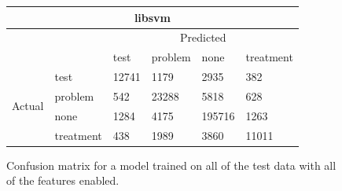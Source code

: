 \documentclass[preprint]{style}
\begin{document}
\begin{figure}[t]
\begin{center}
\begin{tabular}{|l|l|l|l|l|l|}
	\end{tabular}
\end{center}
		
\begin{center}
	\begin{tabular}{|l|l|l|l|l|l|}
	\hline
	\multicolumn{6}{|c|}{\bf libsvm} \\ \hline
	& & \multicolumn{4}{|c|}{Predicted} \\ \hline
	& & test & problem & none & treatment \\ \hline
	\multirow{4}{*}{\begin{sideways}Actual\end{sideways}}
		& test & 12741 & 1179 & 2935 & 382	\\ \hline
		& problem & 542 & 23288 & 5818 & 628	\\ \hline
		& none & 1284 & 4175 & 195716 & 1263	\\ \hline
		& treatment & 438 & 1989 & 3860 & 11011	\\ \hline

	\end{tabular}
\end{center}

\caption{Confusion matrix for a model trained on all of the test data with all of the features enabled.}
\label{fig:all_confusion_matrix}
\end{figure}
\end{document}
